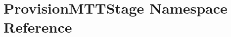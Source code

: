 \hypertarget{namespaceProvisionMTTStage}{\section{Provision\-M\-T\-T\-Stage Namespace Reference}
\label{namespaceProvisionMTTStage}
}
